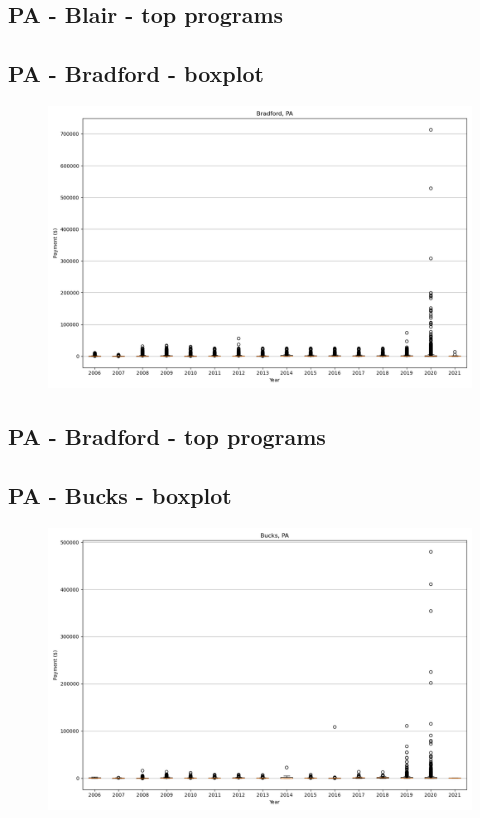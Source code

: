 \subsection*{PA - Blair - top programs}

\newpage
\subsection*{PA - Bradford - boxplot}
\begin{figure}[h]
\centering
\includegraphics[width=7in]{../output/boxplots/counties/Bradford-PA_boxplot.png}
\end{figure}


\subsection*{PA - Bradford - top programs}

\newpage
\subsection*{PA - Bucks - boxplot}
\begin{figure}[h]
\centering
\includegraphics[width=7in]{../output/boxplots/counties/Bucks-PA_boxplot.png}
\end{figure}


